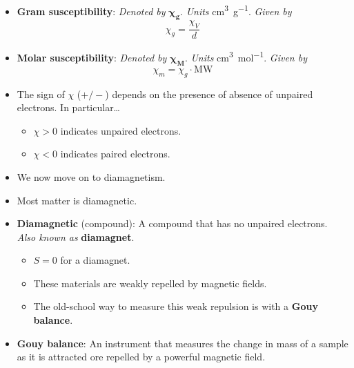 \documentclass[../notes.tex]{subfiles}
\begin{document}
\begin{itemize}
    \item \textbf{Gram susceptibility}: \emph{Denoted by} $\bm{\chi_g}$. \emph{Units} \si{\cubic\centi\meter\per\gram}. \emph{Given by}
    \begin{equation*}
        \chi_g = \frac{\chi_V}{d}
    \end{equation*}
    \item \textbf{Molar susceptibility}: \emph{Denoted by} $\bm{\chi_M}$. \emph{Units} \si{\cubic\centi\meter\per\mole}. \emph{Given by}
    \begin{equation*}
        \chi_m = \chi_g\cdot\text{MW}
    \end{equation*}
    \item The sign of $\chi$ ($+/-$) depends on the presence of absence of unpaired electrons. In particular\dots
    \begin{itemize}
        \item $\chi>0$ indicates unpaired electrons.
        \item $\chi<0$ indicates paired electrons.
    \end{itemize}
    \item We now move on to diamagnetism.
    \item Most matter is diamagnetic.
    \item \textbf{Diamagnetic} (compound): A compound that has no unpaired electrons. \emph{Also known as} \textbf{diamagnet}.
    \begin{itemize}
        \item $S=0$ for a diamagnet.
        \item These materials are weakly repelled by magnetic fields.
        \item The old-school way to measure this weak repulsion is with a \textbf{Gouy balance}.
    \end{itemize}
    \item \textbf{Gouy balance}: An instrument that measures the change in mass of a sample as it is attracted ore repelled by a powerful magnetic field.
    \begin{figure}[h!]
        \centering
\end{figure}
\end{itemize}
\end{document}
